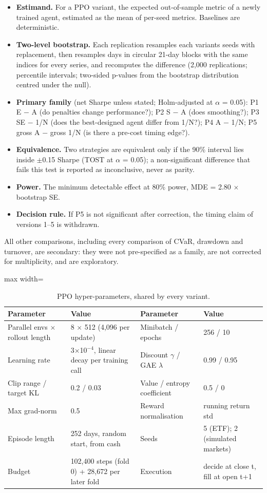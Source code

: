 \documentclass[11pt]{article}
\providecommand{\tightlist}{\setlength{\itemsep}{0pt}\setlength{\parskip}{0pt}}
\begin{document}
\begin{itemize}
\tightlist
\item
  \textbf{Estimand.} For a PPO variant, the expected out-of-sample metric of a newly trained agent, estimated as the mean of per-seed metrics. Baselines are deterministic.
\item
  \textbf{Two-level bootstrap.} Each replication resamples each variant\textquotesingle s seeds with replacement, then resamples days in circular 21-day blocks with the same indices for every series, and recomputes the difference (2,000 replications; percentile intervals; two-sided p-values from the bootstrap distribution centred under the null).
\item
  \textbf{Primary family} (net Sharpe unless stated; Holm-adjusted at $\alpha$ = 0.05): P1 E $-$ A (do penalties change performance?); P2 S $-$ A (does smoothing?); P3 SE $-$ 1/N (does the best-designed agent differ from 1/N?); P4 A $-$ 1/N; P5 gross A $-$ gross 1/N (is there a pre-cost timing edge?).
\item
  \textbf{Equivalence.} Two strategies are equivalent only if the 90\% interval lies inside $\pm$0.15 Sharpe (TOST at $\alpha$ = 0.05); a non-significant difference that fails this test is reported as inconclusive, never as parity.
\item
  \textbf{Power.} The minimum detectable effect at 80\% power, MDE = 2.80 $\times$ bootstrap SE.
\item
  \textbf{Decision rule.} If P5 is not significant after correction, the timing claim of versions 1--5 is withdrawn.
\end{itemize}

All other comparisons, including every comparison of CVaR, drawdown and turnover, are secondary: they were not pre-specified as a family, are not corrected for multiplicity, and are exploratory.

\begin{table}[!htbp]
\centering\scriptsize
\caption{PPO hyper-parameters, shared by every variant.\label{tab-hparams}}
\begin{adjustbox}{max width=\linewidth}
\begin{tabular}{@{}llll@{}}
\toprule
Parameter & Value & Parameter & Value \\
\midrule
Parallel envs $\times$ rollout length & 8 $\times$ 512 (4,096 per update) & Minibatch / epochs & 256 / 10 \\
Learning rate & 3$\times$10$^{-4}$, linear decay per training call & Discount $\gamma$ / GAE $\lambda$ & 0.99 / 0.95 \\
Clip range / target KL & 0.2 / 0.03 & Value / entropy coefficient & 0.5 / 0 \\
Max grad-norm & 0.5 & Reward normalisation & running return std \\
Episode length & 252 days, random start, from cash & Seeds & 5 (ETF); 2 (simulated markets) \\
Budget & 102,400 steps (fold 0) + 28,672 per later fold & Execution & decide at close t, fill at open t+1 \\
\bottomrule
\end{tabular}
\end{adjustbox}
\end{table}
\end{document}

